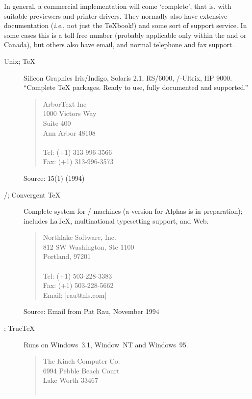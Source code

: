 In general, a commercial implementation will come `complete', that is,
with suitable previewers and printer drivers.  They normally also have
extensive documentation (\emph{i.e}., not just the \TeX{}book!) and some
sort of support service.  In some cases this is a toll free number
(probably applicable only within the  and or Canada), but others
also have email, and normal telephone and fax support.
\begin{description}
\item[Unix; \TeX{}] Silicon Graphics Iris/Indigo, Solaris 2.1,  RS/6000,
  /-Ultrix, HP 9000. ``Complete \TeX{} packages. Ready to use,
  fully documented and supported.''
  \begin{quote}
    ArborText Inc\\
    1000 Victors Way\\
    Suite 400\\
    Ann Arbor  48108\\
    \\[.25\baselineskip]
    Tel: (+1) 313-996-3566\\
    Fax: (+1) 313-996-3573
  \end{quote}
  Source: \TUGboat{} 15(1) (1994)
\item[/; Convergent \TeX{}] Complete system for / machines
  (a version for Alphas is in preparation); includes \LaTeX{},
  multinational typesetting support, \MF{} and Web.
  \begin{quote}
    Northlake Software, Inc.\\
    812 SW Washington, Ste 1100\\
    Portland,   97201\\
    \\[.25\baselineskip]
    Tel: (+1) 503-228-3383\\
    Fax: (+1) 503-228-5662\\
    Email: \Email|rau@nls.com|
  \end{quote}
  Source: Email from Pat Rau, November 1994
\item[; True\TeX{}] Runs on Windows~3.1, Window~NT and Windows~95.
  \begin{quote}
    The Kinch Computer Co.\\
    6994 Pebble Beach Court\\
    Lake Worth  33467\\
    \\[.25\baselineskip]

\end{quote}
\end{description}
